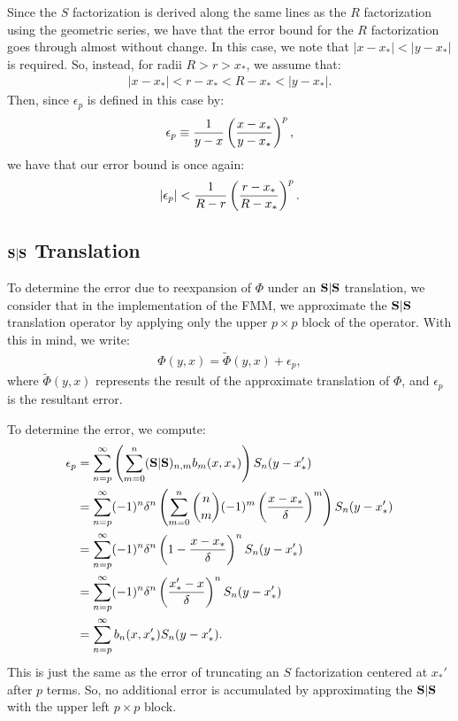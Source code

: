 Since the $S$ factorization is derived along the same lines as the $R$
factorization using the geometric series, we have that the error bound
for the $R$ factorization goes through almost without change. In this
case, we note that $|x - x_*| < |y - x_*|$ is required. So, instead,
for radii $R > r > x_*$, we assume that:
\begin{align*}
  |x - x_*| < r - x_* < R - x_* < |y - x_*|.
\end{align*}
Then, since $\epsilon_p$ is defined in this case by:
\begin{align*}
  \epsilon_p \equiv \frac{1}{y - x} \left(\frac{x - x_*}{y - x_*}\right)^p,
\end{align*}
we have that our error bound is once again:
\begin{align*}
  |\epsilon_p| < \frac{1}{R - r} \left(\frac{r - x_*}{R - x_*}\right)^p.
\end{align*}

\subsection{$\bold{S}|\bold{S}$ Translation}

To determine the error due to reexpansion of $\Phi$ under an $\bold{S}|\bold{S}$
translation, we consider that in the implementation of the FMM, we
approximate the $\bold{S}|\bold{S}$ translation operator by applying only the
upper $p \times p$ block of the operator. With this in mind, we write:
\begin{align*}
  \Phi(y, x) = \tilde{\Phi}(y, x) + \epsilon_p,
\end{align*}
where $\tilde{\Phi}(y, x)$ represents the result of the approximate
translation of $\Phi$, and $\epsilon_p$ is the resultant error.

To determine the error, we compute:
\begin{align*}
  \epsilon_p
  &= \sum_{n=p}^\infty \left(\sum_{m=0}^n (\bold{S}|\bold{S})_{n,m} b_m(x, x_*)\right) S_n(y - x_*') \\
  &= \sum_{n=p}^\infty (-1)^n \delta^n \left(\sum_{m=0}^n {n \choose m} (-1)^m \left(\frac{x - x_*}{\delta}\right)^m\right) S_n(y - x_*') \\
  &= \sum_{n=p}^\infty (-1)^n \delta^n \left(1 - \frac{x - x_*}{\delta}\right)^n S_n(y - x_*') \\
  &= \sum_{n=p}^\infty (-1)^n \delta^n \left(\frac{x_*' - x}{\delta}\right)^n S_n(y - x_*') \\
  &= \sum_{n=p}^\infty b_n(x, x_*') S_n(y - x_*').
\end{align*}
This is just the same as the error of truncating an $S$ factorization
centered at $x_*'$ after $p$ terms. So, no additional error is
accumulated by approximating the $\bold{S}|\bold{S}$ with the upper left
$p \times p$ block.

